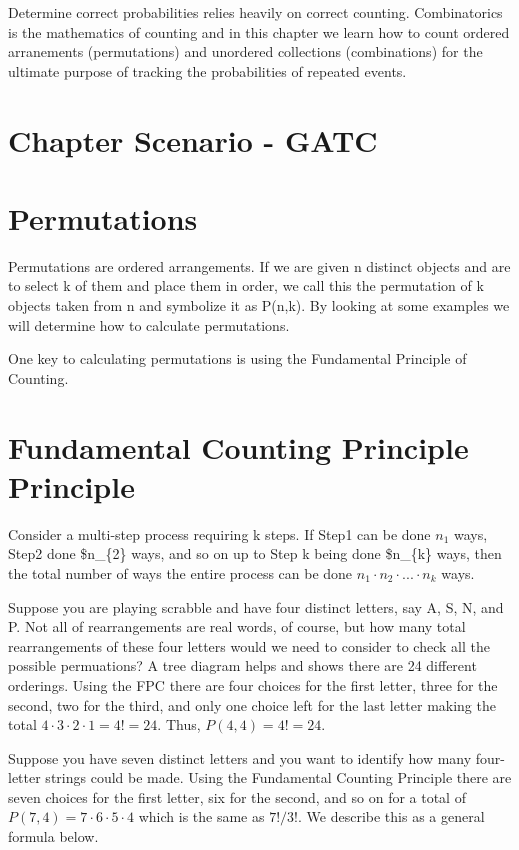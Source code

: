 \documentclass[]{book}
\theoremstyle{definition}
\theoremstyle{definition}
\theoremstyle{definition}
\theoremstyle{remark}
\begin{document}
Determine correct probabilities relies heavily on correct counting.
Combinatorics is the mathematics of counting and in this chapter we
learn how to count ordered arranements (permutations) and unordered
collections (combinations) for the ultimate purpose of tracking the
probabilities of repeated events.

\section{Chapter Scenario - GATC}\label{chapter_scenario}

\section{Permutations}\label{permutations}

Permutations are ordered arrangements. If we are given n distinct
objects and are to select k of them and place them in order, we call
this the permutation of k objects taken from n and symbolize it as
P(n,k). By looking at some examples we will determine how to calculate
permutations.

One key to calculating permutations is using the Fundamental Principle
of Counting.

\section{Fundamental Counting Principle
Principle}\label{fundamental_counting_principle}

Consider a multi-step process requiring k steps. If Step1 can be done
\(n_{1}\) ways, Step2 done \$n\_\{2\} ways, and so on up to Step k being
done \$n\_\{k\} ways, then the total number of ways the entire process
can be done \(n_{1} \cdot n_{2} \cdot ... \cdot n_{k}\) ways.

Suppose you are playing scrabble and have four distinct letters, say A,
S, N, and P. Not all of rearrangements are real words, of course, but
how many total rearrangements of these four letters would we need to
consider to check all the possible permuations? A tree diagram helps and
shows there are 24 different orderings. Using the FPC there are four
choices for the first letter, three for the second, two for the third,
and only one choice left for the last letter making the total
\(4 \cdot 3 \cdot 2 \cdot 1=4!=24\). Thus, \(P(4,4)=4!=24\).

Suppose you have seven distinct letters and you want to identify how
many four-letter strings could be made. Using the Fundamental Counting
Principle there are seven choices for the first letter, six for the
second, and so on for a total of \(P(7,4)=7 \cdot 6 \cdot 5 \cdot 4\)
which is the same as \(7!/3!\). We describe this as a general formula
below.
\end{document}

